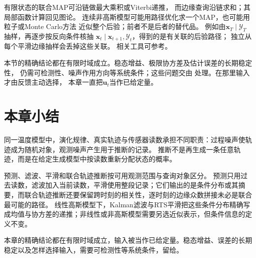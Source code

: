 有限状态的联合MAP可沿链做最大乘积或Viterbi递推，
而边缘查询沿链求和；其局部函数计算回见图论。
连续非高斯模型可能用路径优化求一个MAP，也可能用粒子或Monte Carlo方法
近似整个后验；前者不是后者的替代品。
例如由$\bm x_T\mid\mathcal Y_T$抽样，再逐步按反向条件核抽
$\bm x_t\mid\bm x_{t+1},\mathcal Y_t$，得到的是有关联的后验路径；
独立从每个平滑边缘抽样会丢掉这些关联。
相关工具可参考。

本节的精确结论都在有限时域成立。稳态增益、极限协方差及估计误差的长期稳定性，
仍需可检测性、噪声作用方向等系统条件；这些问题交由
处理。在那里输入才由反馈主动选择，
本章一直把$\bm u_t$当作已给定量。

\section{本章小结}
\label{sec:state-space-estimation-summary}

同一温度模型中，演化规律、真实轨迹与传感器读数承担不同职责：过程噪声使轨迹成为随机对象，观测噪声产生用于推断的记录。
推断不是再生成一条任意轨迹，而是在给定生成模型中按读数重新分配状态的概率。

预测、滤波、平滑和联合轨迹推断按可用观测范围与查询对象区分。
预测只用过去读数，滤波加入当前读数，平滑使用整段记录；它们输出的是条件分布或其摘要，而联合轨迹推断还要保留跨时刻的相关性，逐时刻的边缘众数拼接未必是联合最可能的路径。
线性高斯模型下，Kalman滤波与RTS平滑把这些条件分布精确写成均值与协方差的递推；非线性或非高斯模型需要另选近似表示，但条件信息的定义不变。

本章的精确结论都在有限时域成立，输入被当作已给定量。稳态增益、误差的长期稳定以及怎样选择输入，需要可检测性等系统条件，留给。
